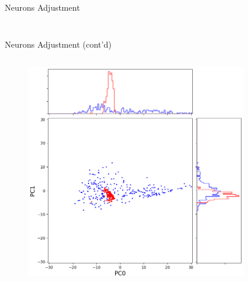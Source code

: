 \documentclass{beamer}
\begin{document}
\begin{frame}{Neurons Adjustment}
\begin{columns}
\begin{column}[t]{.48\textwidth}
\begin{figure}[ht]
        \caption*{\label{fig:neuron-after}}
      \end{figure}
    \end{column}
  \end{columns}
\end{frame}
\begin{frame}{Neurons Adjustment (cont'd)}
  \begin{columns}
    \begin{column}[t]{.48\textwidth}
      \begin{figure}[ht]
        \centering
        \includegraphics[width=1.0\textwidth,height=0.7\textheight]{figures/pca_before.png}
        \caption*{\label{fig:pca-before}}
      \end{figure}
    \end{column}
    \begin{column}[t]{.48\textwidth}
      \begin{figure}[ht]
        \centering

\end{figure}
\end{column}
\end{columns}
\end{frame}
\end{document}
